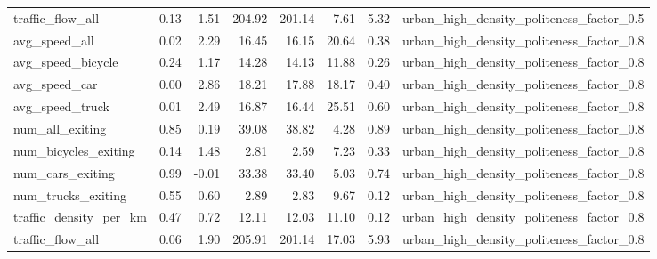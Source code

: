 \begin{table}[ht]
\begin{tabular}{lrrrrrrl}
  traffic\_flow\_all & 0.13 & 1.51 & 204.92 & 201.14 & 7.61 & 5.32 & urban\_high\_density\_politeness\_factor\_0.5 \\ 
  avg\_speed\_all & 0.02 & 2.29 & 16.45 & 16.15 & 20.64 & 0.38 & urban\_high\_density\_politeness\_factor\_0.8 \\ 
  avg\_speed\_bicycle & 0.24 & 1.17 & 14.28 & 14.13 & 11.88 & 0.26 & urban\_high\_density\_politeness\_factor\_0.8 \\ 
  avg\_speed\_car & 0.00 & 2.86 & 18.21 & 17.88 & 18.17 & 0.40 & urban\_high\_density\_politeness\_factor\_0.8 \\ 
  avg\_speed\_truck & 0.01 & 2.49 & 16.87 & 16.44 & 25.51 & 0.60 & urban\_high\_density\_politeness\_factor\_0.8 \\ 
  num\_all\_exiting & 0.85 & 0.19 & 39.08 & 38.82 & 4.28 & 0.89 & urban\_high\_density\_politeness\_factor\_0.8 \\ 
  num\_bicycles\_exiting & 0.14 & 1.48 & 2.81 & 2.59 & 7.23 & 0.33 & urban\_high\_density\_politeness\_factor\_0.8 \\ 
  num\_cars\_exiting & 0.99 & -0.01 & 33.38 & 33.40 & 5.03 & 0.74 & urban\_high\_density\_politeness\_factor\_0.8 \\ 
  num\_trucks\_exiting & 0.55 & 0.60 & 2.89 & 2.83 & 9.67 & 0.12 & urban\_high\_density\_politeness\_factor\_0.8 \\ 
  traffic\_density\_per\_km & 0.47 & 0.72 & 12.11 & 12.03 & 11.10 & 0.12 & urban\_high\_density\_politeness\_factor\_0.8 \\ 
  traffic\_flow\_all & 0.06 & 1.90 & 205.91 & 201.14 & 17.03 & 5.93 & urban\_high\_density\_politeness\_factor\_0.8 \\ 
   \hline
\end{tabular}
\end{table}
